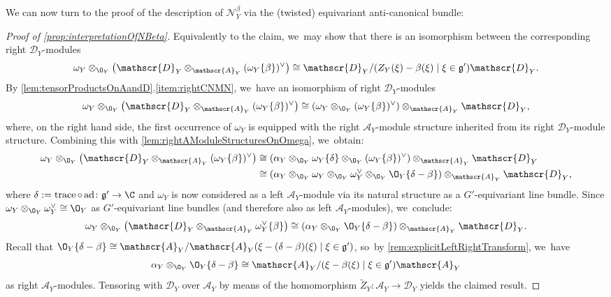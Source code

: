 \documentclass[JEP,XML,SOM,Unicode,published]{cedram}
\newcommand{\cA}{\mathscr{A}}
\newcommand{\frg}{\mathfrak{g}}
\DeclareMathOperator{\ad}{ad}
\DeclareMathOperator{\trace}{trace}
\begin{document}
We can now turn to the proof of the description of $\mathscr N_Y^\beta$ via the (twisted) equivariant
anti-canonical bundle:

\begin{proof}[Proof of \cref{prop:interpretationOfNBeta}]
Equivalently to the claim, we~may show that there is an isomorphism between the corresponding right $\mathscr{D}_Y$\nobreakdash-mod\-ules
\[
\omega_Y \otimes_{\O_Y} \big(\mathscr{D}_Y \otimes_{\cA_Y} (\omega_Y\{\beta\})^\vee\big) \cong \mathscr{D}_Y / (Z_Y(\xi)-\beta(\xi) \mid \xi \in \frg') \mathscr{D}_Y.
\]
By \cref{lem:tensorProductsOnAandD}.\cref{item:rightCNMN}, we~have an isomorphism of right $\mathscr{D}_Y$\nobreakdash-mod\-ules
\[
\omega_Y \otimes_{\O_Y} \big(\mathscr{D}_Y \otimes_{\cA_Y} (\omega_Y\{\beta\})^\vee\big) \cong (\omega_Y \otimes_{\O_Y} (\omega_Y\{\beta\})^\vee) \otimes_{\cA_Y} \mathscr{D}_Y,
\]
where, on the right hand side, the first occurrence of $\omega_Y$ is equipped with the right $\cA_Y$\nobreakdash-mod\-ule structure inherited from its right $\mathscr{D}_Y$\nobreakdash-mod\-ule structure. Combining this with \cref{lem:rightAModuleStructuresOnOmega}, we~obtain:
\begin{align*}
\omega_Y \otimes_{\O_Y} \big(\mathscr{D}_Y \otimes_{\cA_Y} (\omega_Y\{\beta\})^\vee\big)
&\cong (\alpha_Y \otimes_{\O_Y} \omega_Y\{\delta\} \otimes_{\O_Y} (\omega_Y\{\beta\})^\vee) \otimes_{\cA_Y} \mathscr{D}_Y \\
&\cong (\alpha_Y \otimes_{\O_Y} \omega_Y \otimes_{\O_Y} \omega_Y^\vee \otimes_{\O_Y} \O_Y\{\delta-\beta\}) \otimes_{\cA_Y} \mathscr{D}_Y,
\end{align*}
where $\delta := \trace \circ \ad \colon \frg' \to \C$ and $\omega_Y$ is now considered as a left $\cA_Y$\nobreakdash-mod\-ule via its natural structure as a $G'$-equivariant line bundle. Since $\omega_Y \otimes_{\O_Y} \omega_Y^\vee \cong \O_Y$ as $G'$-equivariant line bundles (and therefore also as left $\cA_Y$\nobreakdash-mod\-ules), we~conclude:
\[
\omega_Y \otimes_{\O_Y} \big(\mathscr{D}_Y \otimes_{\cA_Y} \omega_Y^\vee\{\beta\}\big) \cong (\alpha_Y \otimes_{\O_Y} \O_Y\{\delta-\beta\}) \otimes_{\cA_Y} \mathscr{D}_Y.
\]
Recall that $\O_Y\{\delta-\beta\} \cong \cA_Y/\cA_Y(\xi-(\delta-\beta)(\xi) \mid \xi \in \frg')$, so~by \cref{rem:explicitLeftRightTransform}, we~have
\[
\alpha_Y \otimes_{\O_Y} \O_Y\{\delta-\beta\} \cong \cA_Y/(\xi-\beta(\xi) \mid \xi \in \frg') \cA_Y
\]
as right $\cA_Y$\nobreakdash-mod\-ules. Tensoring with $\mathscr{D}_Y$ over $\cA_Y$ by means of the homomorphism $\tilde{Z}_Y \colon \cA_Y \to \mathscr D_Y$ yields the claimed result.
\end{proof}
\end{document}
